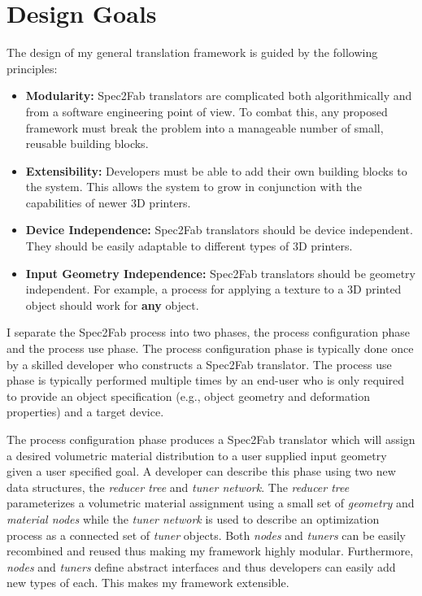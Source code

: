 \chapter{Design Goals}
\label{chap:design}
The design of my general translation framework is guided by the following principles:

\begin{itemize}

\item \textbf{Modularity:} Spec2Fab translators are complicated both algorithmically and from a software engineering point of view. To combat this, any proposed framework must break the problem into a manageable number of small, reusable building blocks. 

\item \textbf{Extensibility:} Developers must be able to add their own building blocks to the system. This allows the system to grow in conjunction with the capabilities of newer 3D printers.
\vspace{-0.25\baselineskip}

\item \textbf{Device Independence:} Spec2Fab translators should be device independent. They should be easily adaptable to different types of 3D printers.
\item \textbf{Input Geometry Independence:} Spec2Fab translators should be geometry independent. For example, a process for applying a texture to a 3D printed object should work for \textbf{any} object.
\vspace{-0.25\baselineskip}
\end{itemize}

I separate the Spec2Fab process into two phases, the process configuration phase and the process use phase. The process configuration phase is typically done once by a skilled developer who  constructs a Spec2Fab translator. The process use phase is typically performed multiple times by an end-user who is only required to provide an object specification (e.g., object geometry and deformation properties) and a target device. 

The process configuration phase produces a Spec2Fab translator
which will assign a desired volumetric material distribution to a user supplied input geometry
given a user specified goal.
A developer can describe this phase using two new data structures, the \emph{reducer tree} and \emph{tuner network}. 
The \emph{reducer tree} parameterizes a volumetric material assignment using a small set of \emph{geometry} and \emph{material nodes} while the \emph{tuner network} is used to describe an optimization process as a connected set of \emph{tuner} objects.
Both \emph{nodes} and \emph{tuners} can be easily recombined and reused
thus making my framework highly modular. Furthermore,
\emph{nodes} and \emph{tuners} define abstract interfaces and thus developers can easily add new types of each.
This makes my framework extensible.
	
